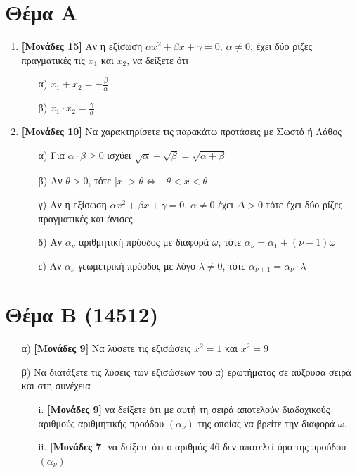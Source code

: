 \documentclass[12pt]{article}
\begin{document}
\section*{Θέμα Α}
  \noindent
  \begin{enumerate}
    \item \textbf{[Μονάδες 15]} Αν η εξίσωση $αx^2+βx+γ=0$, $α\ne 0$, έχει δύο ρίζες πραγματικές τις $x_1$ και $x_2$, να δείξετε ότι
      \begin{enumerate}
        \item [α)] $x_1+x_2=-\frac{β}{α}$
        \item [β)] $x_1\cdot x_2=\frac{γ}{α}$
      \end{enumerate}
    \item \textbf{[Μονάδες 10]} Να χαρακτηρίσετε τις παρακάτω προτάσεις με Σωστό ή Λάθος
    \begin{enumerate}
      \item [α)] Για $α\cdot β\ge 0$ ισχύει $\sqrt{α}+\sqrt{β}=\sqrt{α+β}$
      \item [β)] Αν $θ>0$, τότε $|x|>θ\iff -θ<x<θ$
      \item [γ)] Αν η εξίσωση $αx^2+βx+γ=0$, $α\ne 0 $ έχει $Δ>0$ τότε έχει δύο ρίζες πραγματικές και άνισες.
      \item [δ)] Αν $α_ν$ αριθμητική πρόοδος με διαφορά $ω$, τότε $α_ν=α_1+(ν-1)ω$
      \item [ε)] Αν $α_ν$ γεωμετρική πρόοδος με λόγο $λ\ne 0$, τότε $α_{ν+1}=α_ν\cdot λ$
    \end{enumerate}
  \end{enumerate}

\section*{Θέμα Β (14512)}
  \noindent
    \begin{enumerate}
      \item [α)] \textbf{[Μονάδες 9]} Να λύσετε τις εξισώσεις $x^2=1$ και $x^2=9$
      \item [β)] Να διατάξετε τις λύσεις των εξισώσεων του α) ερωτήματος σε αύξουσα σειρά και στη συνέχεια
        \begin{enumerate}
          \item [i.] \textbf{[Μονάδες 9]} να δείξετε ότι με αυτή τη σειρά αποτελούν διαδοχικούς αριθμούς αριθμητικής προόδου $(α_ν)$ της οποίας να βρείτε την διαφορά $ω$.
          \item [ii.] \textbf{[Μονάδες 7]} να δείξετε ότι ο αριθμός 46 δεν αποτελεί όρο της προόδου $(α_ν)$
        \end{enumerate}
    \end{enumerate}
\end{document}
